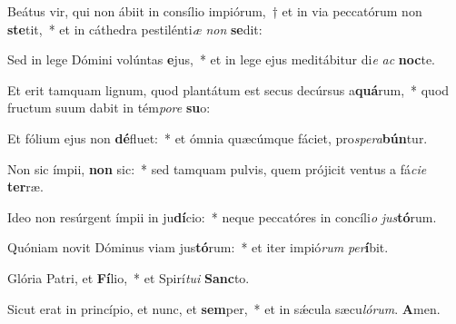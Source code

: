 \item Beátus vir, qui non ábiit in consílio impiórum,~† et in via peccatórum non \textbf{ste}tit,~* et in cáthedra pestilénti\textit{æ} \textit{non} \textbf{se}dit:
\item Sed in lege Dómini volúntas \textbf{e}jus,~* et in lege ejus meditábitur di\textit{e} \textit{ac} \textbf{noc}te.
\item Et erit tamquam lignum, quod plantátum est secus decúrsus a\textbf{quá}rum,~* quod fructum suum dabit in tém\textit{po}\textit{re} \textbf{su}o:
\item Et fólium ejus non \textbf{dé}fluet:~* et ómnia quæcúmque fáciet, pro\textit{spe}\textit{ra}\textbf{bún}tur.
\item Non sic ímpii, \textbf{non} sic:~* sed tamquam pulvis, quem prójicit ventus a fá\textit{ci}\textit{e} \textbf{ter}ræ.
\item Ideo non resúrgent ímpii in ju\textbf{dí}cio:~* neque peccatóres in concíli\textit{o} \textit{jus}\textbf{tó}rum.
\item Quóniam novit Dóminus viam jus\textbf{tó}rum:~* et iter impió\textit{rum} \textit{per}\textbf{í}bit.
\item Glória Patri, et \textbf{Fí}lio,~* et Spirí\textit{tu}\textit{i} \textbf{Sanc}to.
\item Sicut erat in princípio, et nunc, et \textbf{sem}per,~* et in sǽcula sæcu\textit{ló}\textit{rum}. \textbf{A}men.
